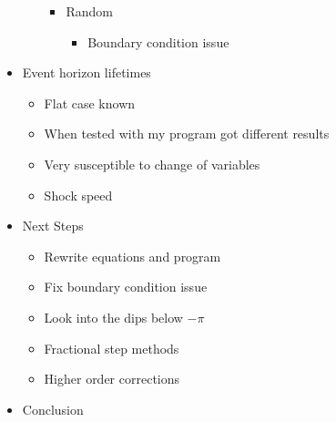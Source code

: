 \documentclass[12pt]{article}
\begin{document}
\begin{itemize}
\begin{itemize}
\begin{itemize}
\begin{itemize}
                        \end{itemize}

                    \item Random

                        \begin{itemize}

                            \item Boundary condition issue

                        \end{itemize}

                \end{itemize}

        \end{itemize}

    \item Event horizon lifetimes

        \begin{itemize}

            \item Flat case known

            \item When tested with my program got different results

            \item Very susceptible to change of variables

            \item Shock speed

        \end{itemize}

    \item Next Steps

        \begin{itemize}

            \item Rewrite equations and program

            \item Fix boundary condition issue

            \item Look into the dips below $-\pi$

            \item Fractional step methods

            \item Higher order corrections

        \end{itemize}

    \item Conclusion

\end{itemize}
\end{document}
